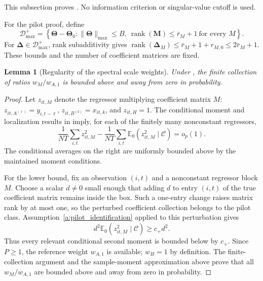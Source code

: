 \documentclass[11pt]{article}
\numberwithin{equation}{section}
\newtheorem{lemma}{Lemma}
\theoremstyle{remark}
\newcommand{\Ezero}{\mathbb E_0}
\newcommand{\rank}{\operatorname{rank}}
\newcommand{\bM}{\bm M}
\newcommand{\bDelta}{\bm\Delta}
\newcommand{\bTheta}{\bm\Theta}
\newcommand{\calD}{\mathcal D}
\begin{document}
This subsection proves . No information criterion or singular-value cutoff is used.

For the pilot proof, define
\begin{equation}
\label{eq:pilot_difference_class}
\calD_{\max}^{+}
=
\left\{
\bTheta-\bTheta_0:
\|\bTheta\|_{\max}\le B,
\ \rank(\bM)\le\bar r_M+1\ \text{for every }M
\right\}.
\end{equation}
For $\bDelta\in\calD_{\max}^{+}$, rank subadditivity gives $\rank(\bDelta_M)\le\bar r_M+1+r_{M,0}\le2\bar r_M+1$. These bounds and the number of coefficient matrices are fixed.

\begin{lemma}[Regularity of the spectral scale weights]
\label{lem:rank_scale_weights}
Under , the finite collection of ratios $w_M/w_{A,1}$ is bounded above and away from zero in probability.
\end{lemma}

\begin{proof}
Let $z_{it,M}$ denote the regressor multiplying coefficient matrix $M$: $z_{it,A^{(\ell)}}=y_{i,t-\ell}$, $z_{it,B^{(k)}}=x_{it,k}$, and $z_{it,H}=1$. The conditional moment and localization results in  imply, for each of the finitely many nonconstant regressors,
\[
\frac1{NT}\sum_{i,t}z_{it,M}^2
-
\frac1{NT}\sum_{i,t}\Ezero(z_{it,M}^2\mid\mathscr C)
=o_p(1).
\]
The conditional averages on the right are uniformly bounded above by the maintained moment conditions.

For the lower bound, fix an observation $(i,t)$ and a nonconstant regressor block $M$. Choose a scalar $d\ne0$ small enough that adding $d$ to entry $(i,t)$ of the true coefficient matrix remains inside the box. Such a one-entry change raises matrix rank by at most one, so the perturbed coefficient collection belongs to the pilot class. Assumption~\ref{a:pilot_identification} applied to this perturbation gives
\[
d^2\Ezero(z_{it,M}^2\mid\mathscr C)\ge c_+d^2.
\]
Thus every relevant conditional second moment is bounded below by $c_+$. Since $P\ge1$, the reference weight $w_{A,1}$ is available; $w_H=1$ by definition. The finite-collection argument and the sample-moment approximation above prove that all $w_M/w_{A,1}$ are bounded above and away from zero in probability.
\end{proof}
\end{document}
